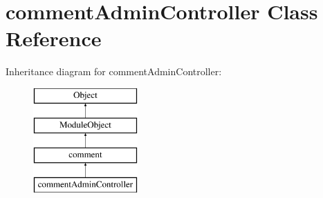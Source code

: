 \hypertarget{classcommentAdminController}{}\section{comment\+Admin\+Controller Class Reference}
\label{classcommentAdminController}
Inheritance diagram for comment\+Admin\+Controller\+:\begin{figure}[H]
\begin{center}
\leavevmode
\includegraphics[height=4.000000cm]{classcommentAdminController}
\end{center}
\end{figure}
